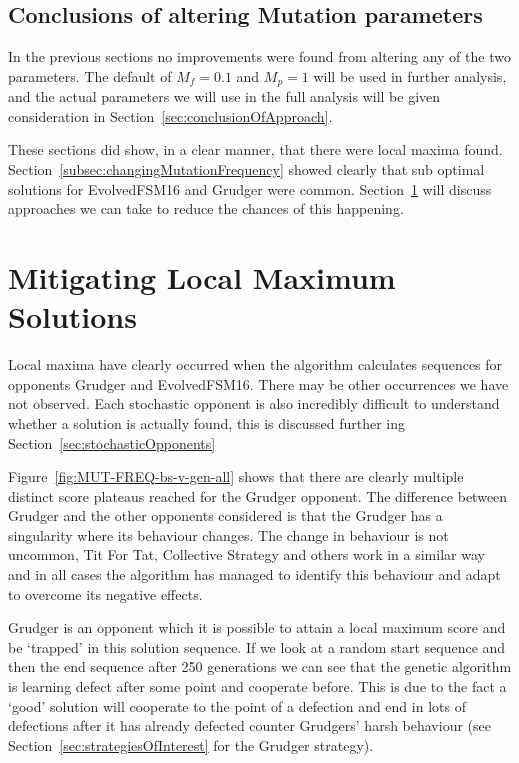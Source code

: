 
\subsection{Conclusions of altering Mutation parameters}
In the previous sections no improvements were found from altering any of the two parameters. 
The default of $M_f=0.1$ and $M_p=1$ will be used in further analysis, and the actual parameters we will use in the full analysis will be given consideration in Section~\ref{sec:conclusionOfApproach}.

These sections did show, in a clear manner, that there were local maxima found. 
Section~\ref{subsec:changingMutationFrequency} showed clearly that sub optimal solutions for EvolvedFSM16 and Grudger were common.
Section~\ref{sec:mitigatingLocalMaximums} will discuss approaches we can take to reduce the chances of this happening.

\section{Mitigating Local Maximum Solutions}\label{sec:mitigatingLocalMaximums}
Local maxima have clearly occurred when the algorithm calculates sequences for opponents Grudger and EvolvedFSM16.
There may be other occurrences we have not observed.
Each stochastic opponent is also incredibly difficult to understand whether a solution is actually found, this is discussed further ing Section~\ref{sec:stochasticOpponents}


Figure~\ref{fig:MUT-FREQ-bs-v-gen-all} shows that there are clearly multiple distinct score plateaus reached for the Grudger opponent.
The difference between Grudger and the other opponents considered is that the Grudger has a singularity where its behaviour changes.
The change in behaviour is not uncommon, Tit For Tat, Collective Strategy and others work in a similar way and in all cases the algorithm has managed to identify this behaviour and adapt to overcome its negative effects.

Grudger is an opponent which it is possible to attain a local maximum score and be `trapped' in this solution sequence.
If we look at a random start sequence and then the end sequence after 250 generations we can see that the genetic algorithm is learning defect after some point and cooperate before.
This is due to the fact a `good' solution will cooperate to the point of a defection and end in lots of defections after it has already defected counter Grudgers' harsh behaviour (see Section~\ref{sec:strategiesOfInterest} for the Grudger strategy).

